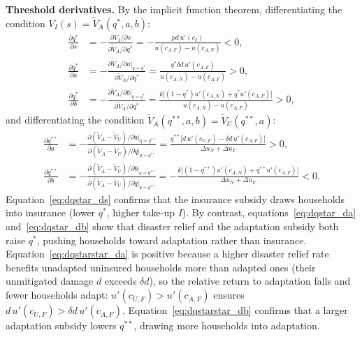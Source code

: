 \documentclass{article}
\begin{document}
\textbf{Threshold derivatives.} By the implicit function theorem, differentiating the condition $V_I(s) = \tilde{V}_A(q^*,a,b)$:
\begin{align}
    \frac{\partial q^*}{\partial s}
    &= -\frac{\partial V_I/\partial s}{\partial \tilde{V}_A/\partial q^*}
    = -\frac{pd\,u'(c_I)}{u(c_{A,F})-u(c_{A,N})}
    < 0, \label{eq:dqstar_ds}
    \\[6pt]
    \frac{\partial q^*}{\partial a}
    &= -\frac{\partial \tilde{V}_A/\partial a\big|_{q=q^*}}{\partial \tilde{V}_A/\partial q^*}
    = \frac{q^*\delta d\,u'(c_{A,F})}{u(c_{A,N})-u(c_{A,F})}
    > 0, \label{eq:dqstar_da}
    \\[6pt]
    \frac{\partial q^*}{\partial b}
    &= -\frac{\partial \tilde{V}_A/\partial b\big|_{q=q^*}}{\partial \tilde{V}_A/\partial q^*}
    = \frac{k\bigl[(1-q^*)u'(c_{A,N})+q^*u'(c_{A,F})\bigr]}{u(c_{A,N})-u(c_{A,F})}
    > 0, \label{eq:dqstar_db}
\end{align}
and differentiating the condition $\tilde{V}_A(q^{**},a,b) = \tilde{V}_U(q^{**},a)$:
\begin{align}
    \frac{\partial q^{**}}{\partial a}
    &= -\frac{\partial(\tilde{V}_A - \tilde{V}_U)/\partial a\big|_{q=q^{**}}}{\partial(\tilde{V}_A - \tilde{V}_U)/\partial q\big|_{q=q^{**}}}
    = \frac{q^{**}\bigl[d\,u'(c_{U,F}) - \delta d\,u'(c_{A,F})\bigr]}{\Delta u_N + \Delta u_F}
    > 0, \label{eq:dqstarstar_da}
    \\[6pt]
    \frac{\partial q^{**}}{\partial b}
    &= -\frac{\partial(\tilde{V}_A - \tilde{V}_U)/\partial b\big|_{q=q^{**}}}{\partial(\tilde{V}_A - \tilde{V}_U)/\partial q\big|_{q=q^{**}}}
    = -\frac{k\bigl[(1-q^{**})u'(c_{A,N})+q^{**}u'(c_{A,F})\bigr]}{\Delta u_N + \Delta u_F}
    < 0. \label{eq:dqstarstar_db}
\end{align}
Equation~\eqref{eq:dqstar_ds} confirms that the insurance subsidy draws households into insurance (lower $q^*$, higher take-up $I$). By contrast, equations~\eqref{eq:dqstar_da} and~\eqref{eq:dqstar_db} show that disaster relief and the adaptation subsidy both raise $q^*$, pushing households toward adaptation rather than insurance. Equation~\eqref{eq:dqstarstar_da} is positive because a higher disaster relief rate benefits unadapted uninsured households more than adapted ones (their unmitigated damage $d$ exceeds $\delta d$), so the relative return to adaptation falls and fewer households adapt: $u'(c_{U,F}) > u'(c_{A,F})$ ensures $d\,u'(c_{U,F}) > \delta d\,u'(c_{A,F})$. Equation~\eqref{eq:dqstarstar_db} confirms that a larger adaptation subsidy lowers $q^{**}$, drawing more households into adaptation.
\end{document}
